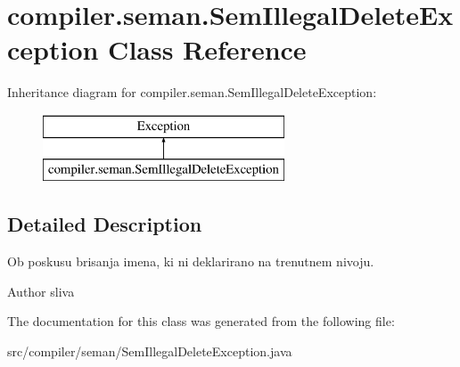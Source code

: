 \hypertarget{classcompiler_1_1seman_1_1_sem_illegal_delete_exception}{}\section{compiler.\+seman.\+Sem\+Illegal\+Delete\+Exception Class Reference}
\label{classcompiler_1_1seman_1_1_sem_illegal_delete_exception}
Inheritance diagram for compiler.\+seman.\+Sem\+Illegal\+Delete\+Exception\+:\begin{figure}[H]
\begin{center}
\leavevmode
\includegraphics[height=2.000000cm]{classcompiler_1_1seman_1_1_sem_illegal_delete_exception}
\end{center}
\end{figure}


\subsection{Detailed Description}
Ob poskusu brisanja imena, ki ni deklarirano na trenutnem nivoju.

\begin{DoxyAuthor}{Author}
sliva 
\end{DoxyAuthor}


The documentation for this class was generated from the following file\+:\begin{DoxyCompactItemize}
\item 
src/compiler/seman/Sem\+Illegal\+Delete\+Exception.\+java\end{DoxyCompactItemize}

